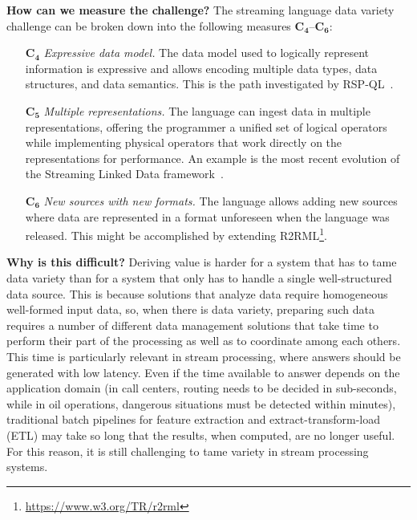 \textbf{How can we measure the challenge?}
%
The streaming language data variety challenge can be broken down
into the following measures $\mathbf{C_4}$--$\mathbf{C_6}$:

\begin{itemize}
  \item[$\mathbf{C_4}$] \emph{Expressive data model.}  The data model
    used to logically represent information is expressive and allows
    encoding multiple data types, data structures, and data
    semantics. This is the path investigated by
    RSP-QL~\cite{DellAglioDataScience2017,DBLP:conf/debs/ValleDM16}.
  \item[$\mathbf{C_5}$] \emph{Multiple representations.} The language
    can ingest data in multiple representations, offering the
    programmer a unified set of logical operators while implementing
    physical operators that work directly on the representations for
    performance. An example is the most recent evolution of the
    Streaming Linked Data framework~\cite{DBLP:conf/esws/BalduiniV017a}.
  \item[$\mathbf{C_6}$] \emph{New sources with new formats.} The
    language allows adding new sources where data are represented in a
    format unforeseen when the language was
    released. This might be accomplished by extending
    R2RML\footnote{\url{https://www.w3.org/TR/r2rml}}.
\end{itemize}

\textbf{Why is this difficult?}
%
Deriving value is harder for a system that has to tame data variety
than for a system that only has to handle a single well-structured
data source. This is because solutions that analyze data require
homogeneous well-formed input data, so, when there is data variety,
preparing such data requires a number of different data management solutions that take time to
perform their part of the processing as well as to coordinate among each others. This time is particularly relevant in stream
processing, where answers should be generated with low latency. Even
if the time available to answer depends on the application domain (in
call centers, routing needs to be decided in sub-seconds, while in oil
operations, dangerous situations must be detected within
minutes), traditional batch pipelines for feature extraction and
extract-transform-load (ETL) may take so long that the results, when
computed, are no longer useful. For this reason, it is still
challenging to tame variety in stream processing systems.
